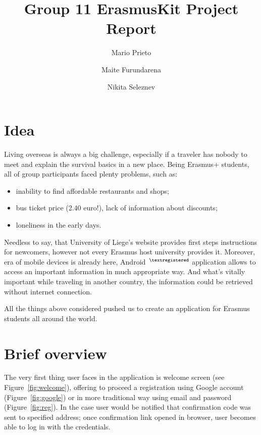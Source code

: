 \documentclass[runningheads,a4paper]{llncs}
\begin{document}
\title{Group 11 ErasmusKit Project Report}

\author{Mario Prieto\and Maite Furundarena\and Nikita Seleznev}


\maketitle


\section{Idea}
Living overseas is always a big challenge, especially if a traveler has nobody to
meet and explain the survival basics in a new place. Being Erasmus+ \cite{erasmus_url}
students, all of group participants faced plenty problems, such as:
\begin{itemize}
	\item inability to find affordable restaurants and shops;
	\item bus ticket price (2.40 euro!), lack of information about discounts;
	\item loneliness in the early days.
\end{itemize}
Needless to say, that University of  Liege's website provides \cite{ulg_brochure} first steps
instructions for newcomers, however not every Erasmus host university provides it.
Moreover, era of mobile devices is already here, Android~$^{\tiny{\textregistered}}$	application allows
to access an important information in much appropriate way. And what's vitally
important while traveling in another country, the information could be retrieved
without internet connection.

All the things above considered pushed us to create an application for Erasmus
students all around the world.


\section{Brief overview}
The very first thing user faces in the application is welcome screen (see
Figure~\ref{fig:welcome}), offering to proceed a registration using Google account
(Figure~\ref{fig:google}) or in more traditional way using email and password 
(Figure~\ref{fig:reg}). In the case user would be notified that confirmation code
was sent to specified address; once confirmation link opened in browser, user
becomes able to log in with the credentials.
\end{document}
